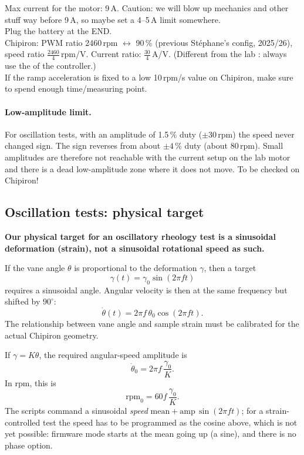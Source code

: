 \documentclass[a4paper,11pt]{article}
\newcommand{\code}[1]{\texttt{\detokenize{#1}}}
\begin{document}
Max current for the motor: 9\,A. Caution: we will blow up mechanics and other stuff way before 9\,A, so maybe set a 4--5\,A limit somewhere. \\

Plug the battery at the END. \\

Chipiron: PWM ratio 2460\,rpm $\leftrightarrow$ 90\,\% (previous Stéphane's config, 2025/26), speed ratio $\frac{2460}{4}$\,rpm/V. Current ratio: $\frac{30}{4}$\,A/V. (Different from the lab \code{.edc}: always use the \code{.edc} of the controller.) \\

If the ramp acceleration is fixed to a low 10\,rpm/s value on Chipiron, make sure to spend enough time/measuring point. \\

\paragraph{Low-amplitude limit.} For oscillation tests, with an amplitude of 1.5\,\% duty ($\pm30$\,rpm) the speed never changed sign. The sign reverses from about $\pm4$\,\% duty (about 80\,rpm). Small amplitudes are therefore not reachable with the current setup on the lab motor and there is a dead low-amplitude zone where it does not move. To be checked on Chipiron!

\subsection{Oscillation tests: physical target}\label{sec:osc}

\textbf{Our physical target for an oscillatory rheology test is a sinusoidal deformation (strain), not a sinusoidal rotational speed as such.}

If the vane angle $\theta$ is proportional to the deformation $\gamma$, then a target
\[
  \gamma(t)=\gamma_0\sin(2\pi f t)
\]
requires a sinusoidal angle. Angular velocity is then at the same frequency but shifted by $90^\circ$:
\[
  \dot{\theta}(t)=2\pi f\,\theta_0\cos(2\pi f t).
\]
The relationship between vane angle and sample strain must be calibrated for the actual Chipiron geometry.

If $\gamma=K\theta$, the required angular-speed amplitude is
\[
  \dot{\theta}_0=2\pi f\,\frac{\gamma_0}{K}.
\]
In rpm, this is
\[
  \mathrm{rpm}_0=60f\,\frac{\gamma_0}{K}.
\]
The scripts command a sinusoidal \emph{speed} $\text{mean}+\text{amp}\,\sin(2\pi f t)$; for a strain-controlled test the speed has to be programmed as the cosine above, which is not yet possible: firmware mode starts at the mean going up (a sine), and there is no phase option.
\end{document}
